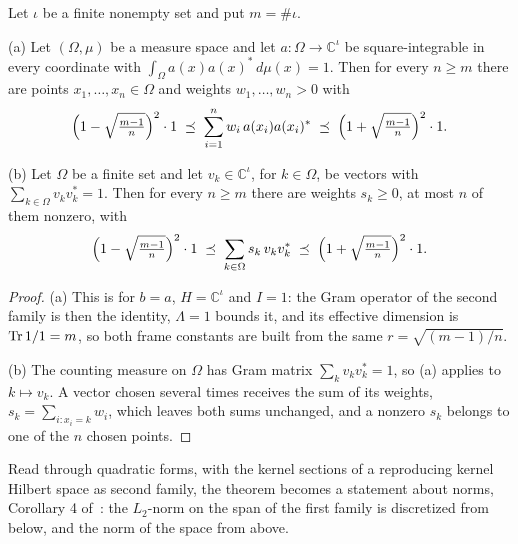 \begin{corollary}[Sparsification]
\label{cor:bss}
\leanok
Let $\iota$ be a finite nonempty set and put $m = \#\iota$.

(a) Let $(\Omega, \mu)$ be a measure space and let $a : \Omega \to \mathbb{C}^{\iota}$ be
square-integrable in every coordinate with $\int_\Omega a(x) a(x)^* \, d\mu(x) = 1$. Then
for every $n \geq m$ there are points $x_1, \dots, x_n \in \Omega$ and weights
$w_1, \dots, w_n > 0$ with
\[
  \Bigl(1 - \sqrt{\tfrac{m-1}{n}}\Bigr)^2 \cdot 1
    \; \preceq \; \sum_{i=1}^n w_i \, a(x_i) a(x_i)^*
    \; \preceq \; \Bigl(1 + \sqrt{\tfrac{m-1}{n}}\Bigr)^2 \cdot 1 .
\]

(b) Let $\Omega$ be a finite set and let $v_k \in \mathbb{C}^{\iota}$, for $k \in \Omega$, be
vectors with $\sum_{k \in \Omega} v_k v_k^* = 1$. Then for every $n \geq m$ there are weights
$s_k \geq 0$, at most $n$ of them nonzero, with
\[
  \Bigl(1 - \sqrt{\tfrac{m-1}{n}}\Bigr)^2 \cdot 1
    \; \preceq \; \sum_{k \in \Omega} s_k \, v_k v_k^*
    \; \preceq \; \Bigl(1 + \sqrt{\tfrac{m-1}{n}}\Bigr)^2 \cdot 1 .
\]
\end{corollary}

\begin{proof}
\leanok
{}
(a) This is  for $b = a$, $H = \mathbb{C}^{\iota}$ and $I = 1$: the
Gram operator of the second family is then the identity, $\Lambda = 1$ bounds it, and its
effective dimension is
$\operatorname{Tr} 1 / 1 = m$, so both frame constants are built from the same $r = \sqrt{(m-1)/n}$.

(b) The counting measure on $\Omega$ has Gram matrix $\sum_k v_k v_k^* = 1$, so (a) applies
to $k \mapsto v_k$. A vector chosen several times receives the sum of its weights,
$s_k = \sum_{i : x_i = k} w_i$, which leaves both sums unchanged, and a nonzero $s_k$ belongs
to one of the $n$ chosen points.
\end{proof}

Read through quadratic forms, with the kernel sections of a reproducing kernel Hilbert
space as second family, the theorem becomes a statement about norms, Corollary 4
of~\cite{CDKU}: the $L_2$-norm on the span of the first family is discretized from below,
and the norm of the space from above.

